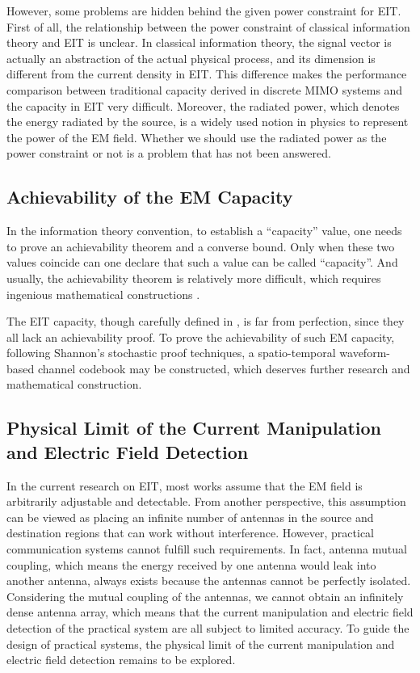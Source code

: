 \documentclass[journal,twocolumn]{IEEEtran}
\begin{document}
However, some problems are hidden behind the given power constraint for EIT. First of all, the relationship between the power constraint of classical information theory and EIT is unclear. In classical information theory, the signal vector is actually an abstraction of the actual physical process, and its dimension is different from the current density in EIT. This difference makes the performance comparison between traditional capacity derived in discrete MIMO systems and the capacity in EIT very difficult. Moreover, the radiated power, which denotes the energy radiated by the source, is a widely used notion in physics to represent the power of the EM field. Whether we should use the radiated power as the power constraint or not is a problem that has not been answered.


\subsection{Achievability of the EM Capacity}
In the information theory convention, to establish a ``capacity'' value, one needs to prove an achievability theorem and a converse bound. Only when these two values coincide can one declare that such a value can be called ``capacity''. And usually, the achievability theorem is relatively more difficult, which requires ingenious mathematical constructions \cite{shannon1948mathematical}. 

The EIT capacity, though carefully defined in \cite{wan2022mutual,zhang2022pdma}, is far from perfection, since they all lack an achievability proof. 
To prove the achievability of such EM capacity, following Shannon's stochastic proof techniques, a spatio-temporal waveform-based channel codebook may be constructed, which deserves further research and mathematical construction.  

\subsection{Physical Limit of the Current Manipulation and Electric Field Detection}
In the current research on EIT, most works assume that the EM field is arbitrarily adjustable and detectable. From another perspective, this assumption can be viewed as placing an infinite number of antennas in the source and destination regions that can work without interference. However, practical communication systems cannot fulfill such requirements. In fact, antenna mutual coupling, which means the energy received by one antenna would leak into another antenna, always exists because the antennas cannot be perfectly isolated. Considering the mutual coupling of the antennas, we cannot obtain an infinitely dense antenna array, which means that the current manipulation and electric field detection of the practical system are all subject to limited accuracy. To guide the design of practical systems, the physical limit of the current manipulation and electric field detection remains to be explored. 
\end{document}
